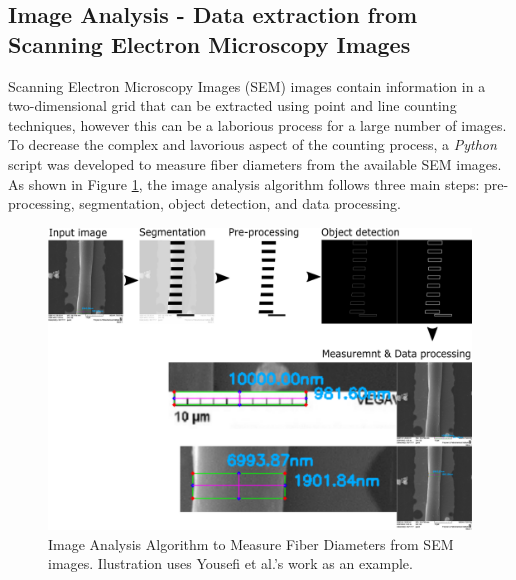 \subsection{Image Analysis - Data extraction from Scanning Electron Microscopy Images}

Scanning Electron Microscopy Images (SEM) images contain information in a two-dimensional grid that can be extracted using point and line counting techniques, however this can be a laborious process for a large number of images. To decrease the complex and lavorious aspect of the counting process, a \emph{Python} script was developed to measure fiber diameters from the available SEM images. As shown in Figure \ref{fig:imageAnalysisAlgorithm}, the image analysis algorithm follows three main steps: pre-processing, segmentation, object detection, and data processing.

\begin{figure}[!th]
\centering
\includegraphics[scale=0.50]{./Figures/imageAnalysisAlgorithm.png}
\decoRule
\caption[Image Analysis Algorithm to Measure Fiber Diameters from SEM images]{Image Analysis Algorithm to Measure Fiber Diameters from SEM images. Ilustration uses Yousefi et al.'s work as an example. \cite{Yousefi2019}}
\label{fig:imageAnalysisAlgorithm}
\end{figure}

